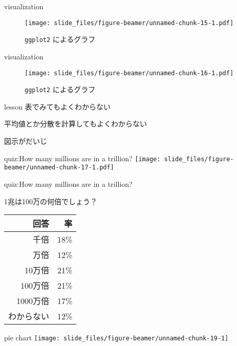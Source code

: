 \documentclass[
  ignorenonframetext,
]{beamer}
\begin{document}
\begin{frame}[fragile]{visualization}
\protect\hypertarget{visualization}{}
\begin{figure}
\centering
\texttt{[image: slide\_files/figure-beamer/unnamed-chunk-15-1.pdf]}
\caption{\texttt{ggplot2} によるグラフ}
\end{figure}
\end{frame}

\begin{frame}[fragile]{visualization}
\protect\hypertarget{visualization-1}{}
\begin{figure}
\centering
\texttt{[image: slide\_files/figure-beamer/unnamed-chunk-16-1.pdf]}
\caption{\texttt{ggplot2} によるグラフ}
\end{figure}
\end{frame}

\begin{frame}{lesson}
\protect\hypertarget{lesson}{}
表でみてもよくわからない

平均値とか分散を計算してもよくわからない

図示がだいじ
\end{frame}

\begin{frame}{quiz:How many millions are in a trillion?}
\protect\hypertarget{quizhow-many-millions-are-in-a-trillion}{}
\texttt{[image: slide\_files/figure-beamer/unnamed-chunk-17-1.pdf]}
\end{frame}

\begin{frame}{quiz:How many millions are in a trillion?}
\protect\hypertarget{quizhow-many-millions-are-in-a-trillion-1}{}
\LARGE

1兆は100万の何倍でしょう？

\begin{tabular}{rr}\toprule
回答&率\\\midrule
千倍&18\%\\
万倍&12\%\\
10万倍&21\%\\
100万倍&21\%\\
1000万倍&17\%\\
わからない&12\%\\\bottomrule
\end{tabular}
\end{frame}

\begin{frame}{pie chart}
\protect\hypertarget{pie-chart}{}
\texttt{[image: slide\_files/figure-beamer/unnamed-chunk-19-1]}
\end{frame}
\end{document}
